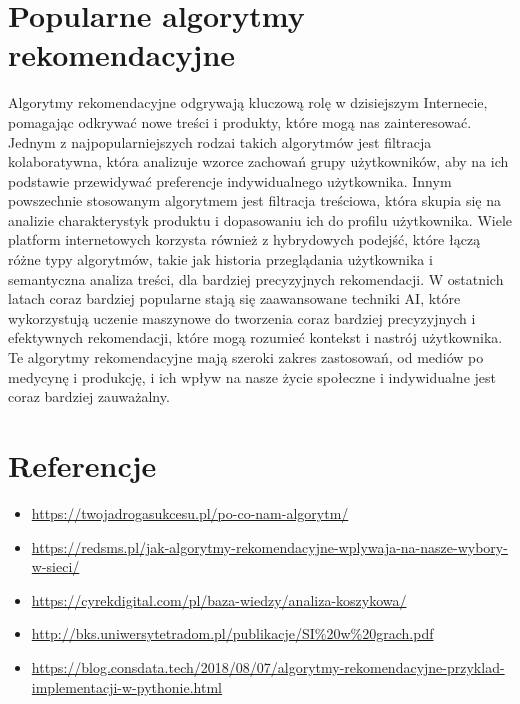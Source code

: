 \documentclass{article}
\begin{document}
\section{Popularne algorytmy rekomendacyjne}

Algorytmy rekomendacyjne odgrywają kluczową rolę w dzisiejszym Internecie, pomagając odkrywać nowe treści i produkty, które mogą nas zainteresować. Jednym z najpopularniejszych 
rodzai takich algorytmów jest filtracja kolaboratywna, która analizuje wzorce zachowań grupy użytkowników, aby na ich podstawie przewidywać preferencje indywidualnego użytkownika. 
Innym powszechnie stosowanym algorytmem jest filtracja treściowa, która skupia się na analizie charakterystyk produktu i dopasowaniu ich do profilu użytkownika.\newline
Wiele platform internetowych korzysta również z hybrydowych podejść, które łączą różne typy algorytmów, takie jak historia przeglądania użytkownika i semantyczna analiza treści, 
dla bardziej precyzyjnych rekomendacji. W ostatnich latach coraz bardziej popularne stają się zaawansowane techniki AI, które wykorzystują uczenie maszynowe do tworzenia coraz 
bardziej precyzyjnych i efektywnych rekomendacji, które mogą rozumieć kontekst i nastrój użytkownika.
Te algorytmy rekomendacyjne mają szeroki zakres zastosowań, od mediów po medycynę i produkcję, i ich wpływ na nasze życie społeczne i indywidualne jest coraz bardziej zauważalny. 

\section{Referencje}
\begin{itemize}
    \item \url{https://twojadrogasukcesu.pl/po-co-nam-algorytm/}
    \item \url{https://redsms.pl/jak-algorytmy-rekomendacyjne-wplywaja-na-nasze-wybory-w-sieci/}
    \item \url{https://cyrekdigital.com/pl/baza-wiedzy/analiza-koszykowa/}
    \item \url{http://bks.uniwersytetradom.pl/publikacje/SI%20w%20grach.pdf}
    \item \href{https://blog.consdata.tech/2018/08/07/algorytmy-rekomendacyjne-przyklad-implementacji-w-pythonie.html}{https://blog.consdata.tech/2018/08/07/algorytmy-rekomendacyjne-przyklad-implementacji-w-pythonie.html}
    
\end{itemize}
\end{document}
